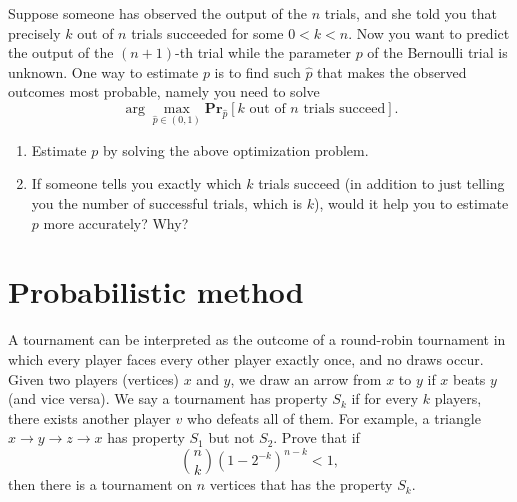\documentclass[a4paper, justified]{tufte-handout}
\begin{document}
\begin{problem}
    Suppose someone has observed the output of the \(n\) trials, and she told you that precisely \(k\) out of \(n\) trials succeeded for some \(0< k< n\). Now you want to predict the output of the \((n+1)\)-th trial while the parameter \(p\) of the Bernoulli trial is unknown. One way to estimate \(p\) is to find such \(\hat{p}\) that makes the observed outcomes most probable, namely you need to solve 
    \[
    \arg \max_{\hat{p}\in(0,1)} \mathbf{Pr}_{\hat{p}} [k \text{ out of } n\text{ trials succeed}].
    \]
    \begin{enumerate}
      \item Estimate \(p\) by solving the above optimization problem.
      \item If someone tells you exactly which \(k\) trials succeed (in addition to just telling you the number of successful trials, which is \(k\)), would it help you to estimate \(p\) more accurately? Why?
    \end{enumerate}
\end{problem}

\begin{solution}
  
\end{solution}

\section{Probabilistic method}

\begin{problem}
  [Tournaments] A tournament can be interpreted as the outcome of a round-robin tournament in which every player faces every other player exactly once, and no draws occur. Given two players (vertices) \( x \) and \( y \), we draw an arrow from \( x \) to \( y \) if \( x \) beats \( y \) (and vice versa). We say a tournament has property \( S_k \) if for every \( k \) players, there exists another player \( v \) who defeats all of them. For example, a triangle \( x \to y \to z \to x \) has property \( S_1 \) but not \( S_2 \). Prove that if  
  \[
  \binom{n}{k}(1 - 2^{-k})^{n-k} < 1,
  \]
  then there is a tournament on \( n \) vertices that has the property \( S_k \). 
\end{problem}
\end{document}
